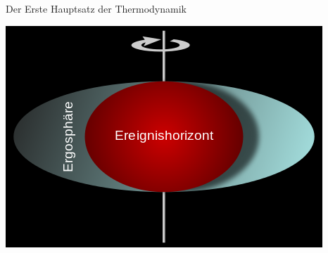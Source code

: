 \documentclass[PHONON = true, screen, ngerman]{beamer}
\begin{document}
	\begin{frame}{Der Erste Hauptsatz der Thermodynamik}
			\hfill 
			\begin{minipage}[l]{0.4\textwidth}
				\includegraphics[width=\textwidth]{Kerr-Neumann}
			\end{minipage}
			\vfill
	\end{frame}	
\end{document}
